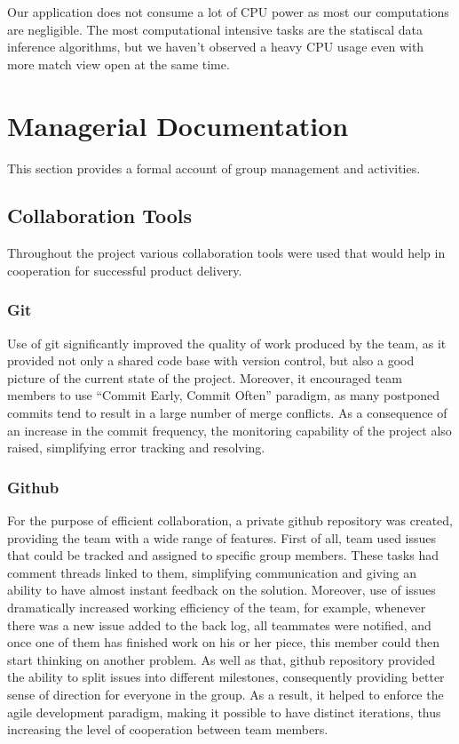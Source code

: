 \documentclass[10pt]{article}
\begin{document}
Our application does not consume a lot of CPU power as most our computations are negligible. The most computational intensive tasks are the statiscal data inference algorithms, but we haven’t observed a heavy CPU usage even with more match view open at the same time.

\clearpage

\section{Managerial Documentation}
\label{sec-group}

This section provides a formal account of group management and activities.

\subsection{Collaboration Tools}

Throughout the project various collaboration tools were used that would help in cooperation for successful product delivery.

\subsubsection{Git}

Use of git significantly improved the quality of work produced by the team, as it provided not only a shared code base with version control, but also a good picture of the current state of the project. Moreover, it encouraged team members to use ``Commit Early, Commit Often'' paradigm, as many postponed commits tend to result in a large number of merge conflicts. As a consequence of an increase in the commit frequency, the monitoring capability of the project also raised, simplifying error tracking and resolving.

\subsubsection{Github}

For the purpose of efficient collaboration, a private github repository was created, providing the team with a wide range of features. First of all, team used issues that could be tracked and assigned to specific group members. These tasks had comment threads linked to them, simplifying communication and giving an ability to have almost instant feedback on the solution. Moreover, use of issues dramatically increased working efficiency of the team, for example, whenever there was a new issue added to the back log, all teammates were notified, and once one of them has finished work on his or her piece, this member could then start thinking on another problem. As well as that, github repository provided the ability to split issues into different milestones, consequently providing better sense of direction for everyone in the group. As a result, it helped to enforce the agile development paradigm, making it possible to have distinct iterations, thus increasing the level of cooperation between team members.
\end{document}
